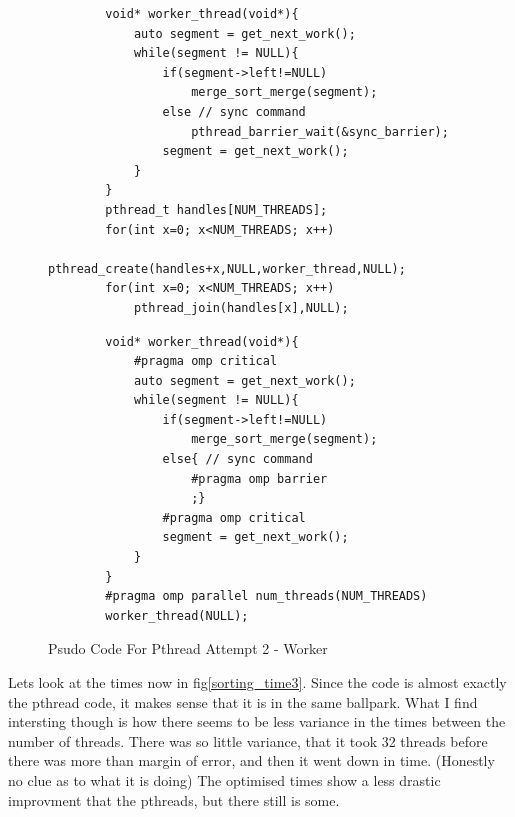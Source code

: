 \documentclass[12pt]{article}
\begin{document}
\begin{figure}[htb]
	\centering
	\begin{minipage}[t]{0.9\textwidth}
	\begin{verbatim}
		void* worker_thread(void*){
			auto segment = get_next_work();
			while(segment != NULL){
				if(segment->left!=NULL)
					merge_sort_merge(segment);
				else // sync command
					pthread_barrier_wait(&sync_barrier);
				segment = get_next_work();
			}
		}
		pthread_t handles[NUM_THREADS];
		for(int x=0; x<NUM_THREADS; x++)
			pthread_create(handles+x,NULL,worker_thread,NULL);
		for(int x=0; x<NUM_THREADS; x++)
			pthread_join(handles[x],NULL);
	\end{verbatim}
	\end{minipage}
	\begin{minipage}[t]{0.9\textwidth}
	\begin{verbatim}
		void* worker_thread(void*){
			#pragma omp critical
			auto segment = get_next_work();
			while(segment != NULL){
				if(segment->left!=NULL)
					merge_sort_merge(segment);
				else{ // sync command
					#pragma omp barrier
					;}
				#pragma omp critical
				segment = get_next_work();
			}
		}
		#pragma omp parallel num_threads(NUM_THREADS)
		worker_thread(NULL);
	\end{verbatim}
	\end{minipage}
	\caption{Psudo Code For Pthread Attempt 2 - Worker}
	\label{openmp_psedo1}
\end{figure}

\clearpage
Lets look at the times now in fig\ref{sorting_time3}.
Since the code is almost exactly the pthread code, it makes sense that it is in the same ballpark.
What I find intersting though is how there seems to be less variance in the times between the number of threads.
There was so little variance, that it took 32 threads before there was more than margin of error, and then it went down in time.
(Honestly no clue as to what it is doing)
The optimised times show a less drastic improvment that the pthreads, but there still is some.
\end{document}
